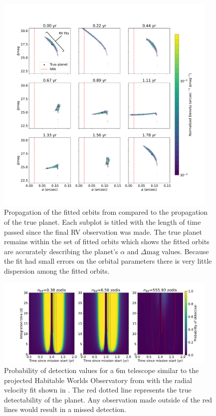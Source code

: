 \begin{figure}
  \begin{center}
    \includegraphics[width=0.95\textwidth]{ch3/figures/pop_propagation_in_time.pdf}
  \end{center}
  \caption{Propagation of the fitted orbits from  compared to
    the propagation of the true planet. Each subplot is titled with the length
    of time passed since the final RV observation was made. The true planet remains
    within the set of fitted orbits which shows the fitted orbits are
  accurately describing the planet's $\alpha$ and $\Delta\textrm{mag}$ values. Because
  the fit had small errors on the orbital parameters there is very little dispersion
  among the fitted orbits.}
  \label{fig:pop_propagation_in_time}
\end{figure}

\begin{figure}
  \begin{center}
    \includegraphics[width=0.95\textwidth]{ch3/figures/pdet_colored_true_overlay.pdf}
  \end{center}
  \caption{Probability of detection values for a 6m telescope similar to the
  projected Habitable Worlds Observatory from \citet{morganExplorationExpectedNumber2022a}
  with the radial velocity fit shown in . The
red dotted line represents the true detectability of the planet. Any
observation made outside of the red lines would result in a missed detection.}
  \label{fig:pdet_colored_true_overlay}
\end{figure}

